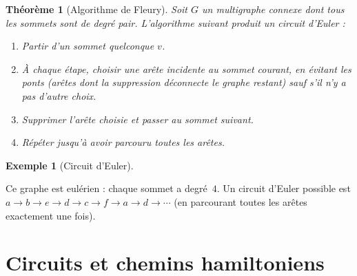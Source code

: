 \documentclass[12pt,a4paper,openany]{book}
\theoremstyle{definition}
\newtheorem{exemple}[definition]{Exemple}
\theoremstyle{plain}
\newtheorem{theoreme}[definition]{Théorème}
\theoremstyle{remark}
\begin{document}
\begin{theoreme}[Algorithme de Fleury]
\label{thm:fleury}
Soit $G$ un multigraphe connexe dont tous les sommets sont de degré pair.
L'algorithme suivant produit un circuit d'Euler :
\begin{enumerate}
  \item Partir d'un sommet quelconque $v$.
  \item À chaque étape, choisir une arête incidente au sommet courant, en
        évitant les \emph{ponts} (arêtes dont la suppression déconnecte le
        graphe restant) sauf s'il n'y a pas d'autre choix.
  \item Supprimer l'arête choisie et passer au sommet suivant.
  \item Répéter jusqu'à avoir parcouru toutes les arêtes.
\end{enumerate}
\end{theoreme}

\begin{exemple}[Circuit d'Euler]
\label{ex:circuit-euler}

\begin{center}
\end{center}

\noindent
Ce graphe est eulérien : chaque sommet a degré~$4$. Un circuit d'Euler
possible est $a \to b \to e \to d \to c \to f \to a \to d \to \cdots$
(en parcourant toutes les arêtes exactement une fois).
\end{exemple}

\section{Circuits et chemins hamiltoniens}
\label{sec:hamilton}
\end{document}
